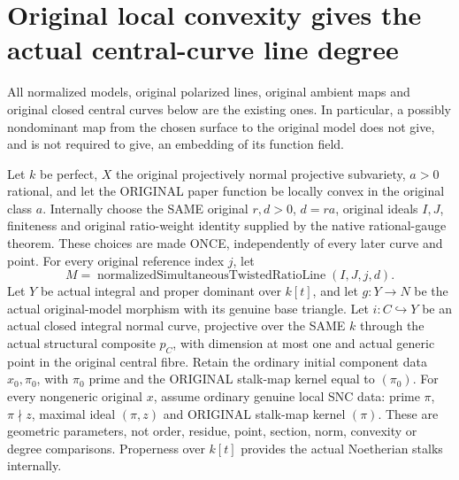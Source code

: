 \section{Original local convexity gives the actual central-curve line degree}

All normalized models, original polarized lines, original ambient maps and
original closed central curves below are the existing ones.  In particular,
a possibly nondominant map from the chosen surface to the original model
does not give, and is not required to give, an embedding of its function field.

\begin{theorem}
\label{thm:intrinsic-numerical-original-convex-gauss-curve-line-degree}
\leanok
{}
Let $k$ be perfect, $X$ the original projectively normal projective
subvariety, $a>0$ rational, and let the ORIGINAL paper function be locally
convex in the original class $a$.  Internally choose the SAME original
$r,d>0$, $d=ra$, original ideals $I,J$, finiteness and original ratio-weight
identity supplied by the native rational-gauge theorem.  These choices are
made ONCE, independently of every later curve and point.  For every
original reference index $j$, let
\[
 M=\operatorname{normalizedSimultaneousTwistedRatioLine}(I,J,j,d).
\]
Let $Y$ be actual integral and proper dominant over $k[t]$, and let
$g:Y\to N$ be the actual original-model morphism with its genuine base
triangle.  Let $i:C\hookrightarrow Y$ be an actual closed integral normal
curve, projective over the SAME $k$ through the actual structural composite
$p_C$, with dimension at most one and actual generic point in the original
central fibre.  Retain the ordinary initial component data $x_0,\pi_0$,
with $\pi_0$ prime and the ORIGINAL stalk-map kernel equal to $(\pi_0)$.
For every nongeneric original $x$, assume ordinary genuine local SNC data:
prime $\pi$, $\pi\nmid z$, maximal ideal $(\pi,z)$ and ORIGINAL stalk-map
kernel $(\pi)$.  These are geometric parameters, not order, residue, point,
section, norm, convexity or degree comparisons.  Properness over $k[t]$
provides the actual Noetherian stalks internally.


\end{theorem}
